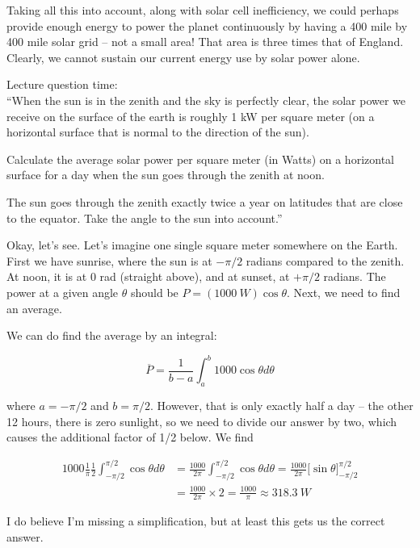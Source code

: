 \documentclass[8.01x]{subfiles}
\begin{document}
Taking all this into account, along with solar cell inefficiency, we could perhaps provide enough energy to power the planet continuously by having a 400 mile by 400 mile solar grid -- not a small area! That area is three times that of England. Clearly, we cannot sustain our current energy use by solar power alone.

Lecture question time:\\
``When the sun is in the zenith and the sky is perfectly clear, the solar power we receive on the surface of the earth is roughly 1 kW per square meter (on a horizontal surface that is normal to the direction of the sun).

Calculate the average solar power per square meter (in Watts) on a horizontal surface for a day when the sun goes through the zenith at noon.

The sun goes through the zenith exactly twice a year on latitudes that are close to the equator. Take the angle to the sun into account.''

Okay, let's see. Let's imagine one single square meter somewhere on the Earth. First we have sunrise, where the sun is at $-\pi/2$ radians compared to the zenith. At noon, it is at 0 rad (straight above), and at sunset, at $+\pi/2$ radians. The power at a given angle $\theta$ should be $P = (\SI{1000}{W})\cos\theta$. Next, we need to find an average.

We can do find the average by an integral:

\begin{equation}
\overbar{P} = \frac{1}{b - a} \int_a^b 1000 \cos \theta d \theta
\end{equation}

where $a = -\pi/2$ and $b = \pi/2$. However, that is only exactly half a day -- the other 12 hours, there is zero sunlight, so we need to divide our answer by two, which causes the additional factor of 1/2 below. We find

\begin{align}
1000 \frac{1}{\pi} \frac{1}{2} \int_{-\pi/2}^{\pi/2} \cos \theta d \theta &= \frac{1000}{2 \pi} \int_{-\pi/2}^{\pi/2} \cos \theta d \theta = \frac{1000}{2\pi} \Big[ \sin \theta \Big]_{-\pi/2}^{\pi/2}\\
                                                              &= \frac{1000}{2\pi} \times 2 = \frac{1000}{\pi} \approx \SI{318.3}{W}
\end{align}

I do believe I'm missing a simplification, but at least this gets us the correct answer.
\end{document}
